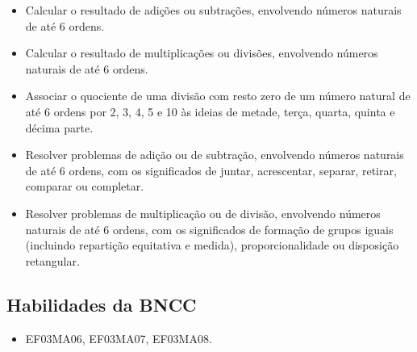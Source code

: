 \begin{itemize}
\item Calcular o resultado de adições ou subtrações, envolvendo números
naturais de até 6 ordens.

\item Calcular o resultado de multiplicações ou divisões, envolvendo números
naturais de até 6 ordens.

\item Associar o quociente de uma divisão com resto zero de um número
natural de até 6 ordens por 2, 3, 4, 5 e 10 às ideias de metade, terça,
quarta, quinta e décima parte.

\item Resolver problemas de adição ou de subtração, envolvendo números
naturais de até 6 ordens, com os significados de juntar, acrescentar,
separar, retirar, comparar ou completar.

\item Resolver problemas de multiplicação ou de divisão, envolvendo números
naturais de até 6 ordens, com os significados de formação de grupos
iguais (incluindo repartição equitativa e medida), proporcionalidade ou
disposição retangular.
\end{itemize}

\subsection{Habilidades da BNCC}

\begin{itemize}
\item EF03MA06, EF03MA07, EF03MA08.
\end{itemize}


